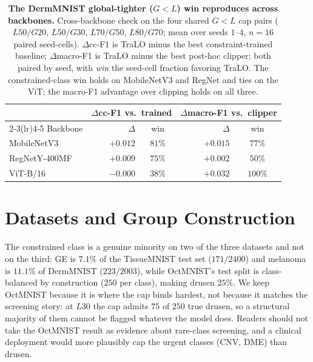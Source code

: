 \documentclass[letterpaper]{article}
\begin{document}




\begin{table}[t]\centering\small
\setlength{\tabcolsep}{5pt}
\caption{\textbf{The DermMNIST global-tighter ($G{<}L$) win reproduces across backbones.}
Cross-backbone check on the four shared $G{<}L$ cap pairs ($L50/G20$, $L50/G30$, $L70/G50$,
$L80/G70$; mean over seeds $1$--$4$, $n{=}16$ paired seed-cells). $\Delta$cc-F1 is TraLO
minus the best constraint-trained baseline; $\Delta$macro-F1 is TraLO minus the best
post-hoc clipper; both paired by seed, with \emph{win} the seed-cell fraction favoring
TraLO. The constrained-class win holds on MobileNetV3 and RegNet and ties on the ViT; the
macro-F1 advantage over clipping holds on all three.}
\label{tab:asym_xbackbone}
\setlength{\tabcolsep}{4pt}\small
\begin{tabular}{l rc rc}
\toprule
 & \multicolumn{2}{c}{$\Delta$cc-F1 vs.\ trained} & \multicolumn{2}{c}{$\Delta$macro-F1 vs.\ clipper} \\
\cmidrule(lr){2-3}\cmidrule(lr){4-5}
Backbone & $\Delta$ & win & $\Delta$ & win \\
\midrule
MobileNetV3    & $+0.012$ & $81\%$  & $+0.015$ & $77\%$ \\
RegNetY-400MF  & $+0.009$ & $75\%$  & $+0.002$ & $50\%$ \\
ViT-B/16       & $-0.000$ & $38\%$  & $+0.032$ & $100\%$ \\
\bottomrule
\end{tabular}
\end{table}






\section{Datasets and Group Construction}
\label{app:groups}

The constrained class is a genuine minority on two of the three datasets and not on the
third: GE is $7.1\%$ of the TissueMNIST test set ($171/2400$) and melanoma is $11.1\%$ of
DermMNIST ($223/2003$), while OctMNIST's test split is class-balanced by construction
($250$ per class), making drusen $25\%$. We keep OctMNIST because it is where the cap
binds hardest, not because it matches the screening story: at $L30$ the cap admits $75$
of $250$ true drusen, so a structural majority of them cannot be flagged whatever the
model does. Readers should not take the OctMNIST result as evidence about rare-class
screening, and a clinical deployment would more plausibly cap the urgent classes (CNV,
DME) than drusen.
\end{document}
